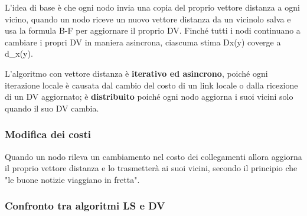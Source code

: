 \documentclass{report}
\begin{document}
L'idea di base è che ogni nodo invia una copia del proprio vettore
distanza a ogni vicino, quando un nodo riceve un nuovo vettore distanza
da un vicinolo salva e usa la formula B-F per aggiornare il proprio DV.
Finché tutti i nodi continuano a cambiare i propri DV in maniera
asincrona, ciascuma stima Dx(y) coverge a d\_x(y).

L'algoritmo con vettore distanza è \textbf{iterativo ed asincrono},
poiché ogni iterazione locale è causata dal cambio del costo di un link
locale o dalla ricezione di un DV aggiornato; è \textbf{distribuito}
poiché ogni nodo aggiorna i suoi vicini solo quando il suo DV cambia.

\hypertarget{header-n203}{%
\subsubsection{Modifica dei costi}\label{header-n203}}

Quando un nodo rileva un cambiamento nel costo dei collegamenti allora
aggiorna il proprio vettore distanza e lo trasmetterà ai suoi vicini,
secondo il principio che "le buone notizie viaggiano in fretta".

\hypertarget{header-n205}{%
\subsubsection{Confronto tra algoritmi LS e DV}\label{header-n205}}
\end{document}
